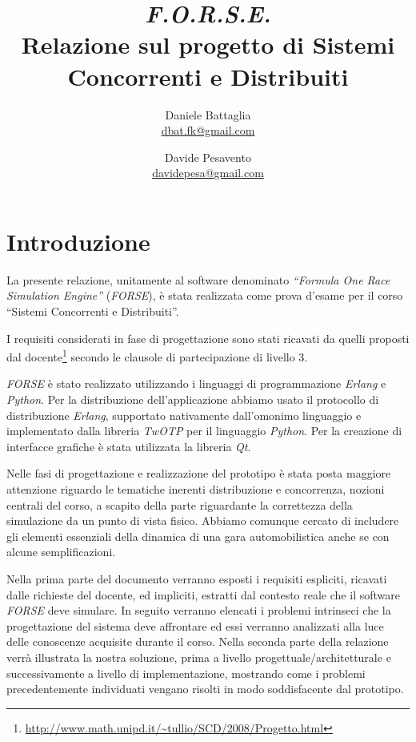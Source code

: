 \documentclass[a4paper]{report}
\title{{\huge \textsl{F.O.R.S.E.}}\\
	{\large Relazione sul progetto di Sistemi Concorrenti e Distribuiti}}
\author{Daniele Battaglia\\\url{dbat.fk@gmail.com}
	\and Davide Pesavento\\\url{davidepesa@gmail.com}}
\newcommand{\Erlang}{\textsl{Erlang}}
\newcommand{\Python}{\textsl{Python}}
\begin{document}
\maketitle

\tableofcontents

\listoffigures

\clearpage


\chapter{Introduzione}
La presente relazione, unitamente al software denominato \textsl{``Formula One Race Simulation Engine''} (\textsl{FORSE}), è stata realizzata come prova d'esame per il corso ``Sistemi Concorrenti e Distribuiti''.

I requisiti considerati in fase di progettazione sono stati ricavati da quelli proposti dal docente\footnote{\url{http://www.math.unipd.it/~tullio/SCD/2008/Progetto.html}} secondo le clausole di partecipazione di livello 3.

\textsl{FORSE} è stato realizzato utilizzando i linguaggi di programmazione \Erlang{} e \Python{}. Per la distribuzione dell'applicazione abbiamo
usato il protocollo di distribuzione \Erlang{}, supportato nativamente dall'omonimo linguaggio e implementato dalla libreria \textsl{TwOTP} per il linguaggio
\Python{}.
Per la creazione di interfacce grafiche è stata utilizzata la libreria \textsl{Qt}.

Nelle fasi di progettazione e realizzazione del prototipo è stata posta maggiore attenzione riguardo le tematiche inerenti distribuzione e concorrenza, nozioni
centrali del corso, a scapito della parte riguardante la correttezza della simulazione da un punto di vista fisico. Abbiamo comunque cercato di includere
gli elementi essenziali della dinamica di una gara automobilistica anche se con alcune semplificazioni.

Nella prima parte del documento verranno esposti i requisiti espliciti, ricavati dalle richieste del docente, ed impliciti, estratti dal contesto reale che il software \textsl{FORSE} deve simulare.
In seguito verranno elencati i problemi intrinseci che la progettazione del sistema deve affrontare ed essi verranno analizzati alla luce delle conoscenze acquisite durante il corso.
Nella seconda parte della relazione verrà illustrata la nostra soluzione, prima a livello progettuale/architetturale e successivamente a livello di implementazione, mostrando come i problemi precedentemente individuati vengano risolti in modo soddisfacente dal prototipo.
\end{document}

